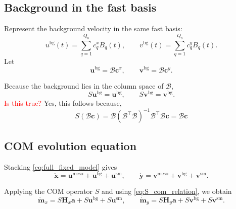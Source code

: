 \documentclass{article}
\begin{document}
\subsection{Background in the fast basis}

Represent the background velocity in the same fast basis:
\begin{equation}
u^{\mathrm{bg}}(t)=\sum_{q=1}^{Q_b} c_q^x B_q(t),
\qquad
v^{\mathrm{bg}}(t)=\sum_{q=1}^{Q_b} c_q^y B_q(t).
\label{eq:bg_model}
\end{equation}
Let
\begin{equation}
\mathbf{u}^{\mathrm{bg}}=\mathcal{B}\mathbf{c}^x,
\qquad
\mathbf{v}^{\mathrm{bg}}=\mathcal{B}\mathbf{c}^y.
\label{eq:bg_stacked}
\end{equation}

Because the background lies in the column space of $\mathcal{B}$,
\begin{equation}
S\mathbf{u}^{\mathrm{bg}}=\mathbf{u}^{\mathrm{bg}},
\qquad
S\mathbf{v}^{\mathrm{bg}}=\mathbf{v}^{\mathrm{bg}}.
\label{eq:bg_invariant}
\end{equation}
\textcolor{red}{Is this true?}
Yes, this follows because,
\begin{equation}
    S(\mathcal{B}\mathbf{c})
=
\mathcal{B}(\mathcal{B}^\top \mathcal{B})^{-1}\mathcal{B}^\top \mathcal{B}\mathbf{c}
=
\mathcal{B}\mathbf{c}
\end{equation}

\subsection{COM evolution equation}

Stacking \eqref{eq:full_fixed_model} gives
\begin{equation}
\dot{\mathbf{x}}
=
\mathbf{u}^{\mathrm{meso}}+\mathbf{u}^{\mathrm{bg}}+\mathbf{u}^{\mathrm{sm}},
\qquad
\dot{\mathbf{y}}
=
\mathbf{v}^{\mathrm{meso}}+\mathbf{v}^{\mathrm{bg}}+\mathbf{v}^{\mathrm{sm}}.
\label{eq:full_stacked}
\end{equation}

Applying the COM operator \(S\) and using \eqref{eq:S_com_relation}, we obtain
\begin{equation}
\dot{\mathbf{m}}_x
=
S\mathbf{H}_x\mathbf{a}
+
S\mathbf{u}^{\mathrm{bg}}
+
S\mathbf{u}^{\mathrm{sm}},
\qquad
\dot{\mathbf{m}}_y
=
S\mathbf{H}_y\mathbf{a}
+
S\mathbf{v}^{\mathrm{bg}}
+
S\mathbf{v}^{\mathrm{sm}}.
\end{equation}
\end{document}
